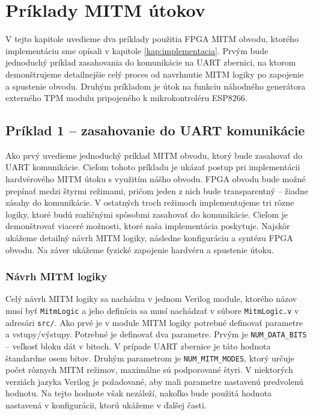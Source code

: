 \chapter{Príklady MITM útokov}
\label{kap:priklady}

V tejto kapitole uvedieme dva príklady použitia FPGA MITM obvodu, ktorého implementáciu sme opísali v kapitole \ref{kap:implementacia}. Prvým bude jednoduchý príklad zasahovania do komunikácie na UART zbernici, na ktorom demonštrujeme detailnejšie celý proces od navrhnutie MITM logiky po zapojenie a spustenie obvodu. Druhým príkladom je útok na funkciu náhodného generátora externého TPM modulu pripojeného k mikrokontroléru ESP8266.

\section{Príklad 1 -- zasahovanie do UART komunikácie} \label{sek:example1}
Ako prvý uvedieme jednoduchý príklad MITM obvodu, ktorý bude zasahovať do UART komunikácie. Cieľom tohoto príkladu je ukázať postup pri implementácii hardvérového MITM útoku s využitím nášho obvodu. FPGA obvodu bude možné prepínať medzi štyrmi režimami, pričom jeden z nich bude transparentný -- žiadne zásahy do komunikácie. V ostatných troch režimoch implementujeme tri rôzne logiky, ktoré budú rozličnými spôsobmi zasahovať do komunikácie. Cieľom je demonštrovať viaceré možnosti, ktoré naša implementácia poskytuje. Najskôr ukážeme detailný návrh MITM logiky, následne konfiguráciu a syntézu FPGA obvodu. Na záver ukážeme fyzické zapojenie hardvéru a spustenie útoku.

\subsection{Návrh MITM logiky} \label{subsek:uartMitmLogic}
Celý návrh MITM logiky sa nachádza v jednom Verilog module, ktorého názov musí byť \texttt{MitmLogic} a jeho definícia sa musí nachádzať v súbore \texttt{MitmLogic.v} v adresári \texttt{src/}. Ako prvé je v module MITM logiky potrebné definovať parametre a vstupy/výstupy. Potrebné je definovať dva parametre. Prvým je \texttt{NUM\_DATA\_BITS} -- veľkosť bloku dát v bitoch. V prípade UART zbernice je táto hodnota štandardne osem bitov. Druhým parametrom je \texttt{NUM\_MITM\_MODES}, ktorý určuje počet rôznych MITM režimov, maximálne sú podporované štyri. V niektorých verziách jazyka Verilog je požadované, aby mali parametre nastavenú predvolenú hodnotu. Na tejto hodnote však nezáleží, nakoľko bude použitá hodnota nastavená v konfigurácii, ktorú ukážeme v ďalšej časti.

